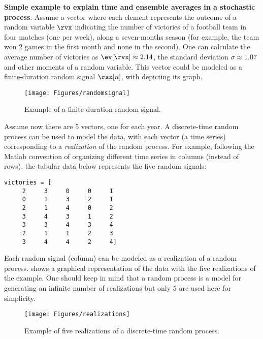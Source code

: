 \bExample \textbf{Simple example to explain time and ensemble averages in a stochastic process}.
\label{ex:simpleRandomProcess}
Assume a vector
\co{[2, 0, 2, 3, 3, 2, 3]} where each element represents the outcome of a random variable $\rvx$ indicating the number of victories of a football team in four matches (one per week), along a seven-months season (for example, the team won 2 games in the first month and none in the second). One can calculate the average number of victories as $\ev [\rvx] \approx 2.14$, the standard deviation $\sigma \approx 1.07$ and other moments of a random variable. This vector could be modeled as a finite-duration random signal $\rsx[n]$, with  depicting its graph. 

\begin{figure}[htbp]
	\centering
		\texttt{[image: Figures/randomsignal]}	
		\caption{Example of a finite-duration random signal.\label{fig:randomsignal}}
\end{figure}

Assume now there are 5 vectors, one for each year. A discrete-time random process can be used to model the data, with each vector (a time series) corresponding to a \emph{realization} of the random process. For example, following the Matlab convention of organizing different time series in columns (instead of rows), the tabular data below represents the five random signals:
\begin{verbatim}
victories = [
     2     3     0     0     1
     0     1     3     2     1
     2     1     4     0     2
     3     4     3     1     2
     3     3     4     3     4
     2     1     1     2     3
     3     4     4     2     4]
\end{verbatim}
Each random signal (column) can be modeled as a realization of a random process.  shows a graphical representation of the data with the five realizations of the example. One should keep in mind that a random process is a model for generating an infinite number of realizations but 
only 5 are used here for simplicity.


\begin{figure}[htbp]
	\centering
		\texttt{[image: Figures/realizations]}		
	\caption{Example of five realizations of a discrete-time random process.\label{fig:realizations}}
\end{figure}

